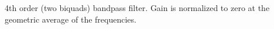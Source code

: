 4th order (two biquads) bandpass filter. Gain is normalized to zero at
the geometric average of the frequencies.



